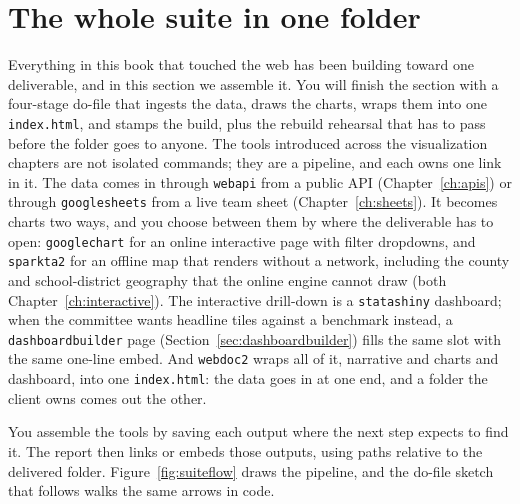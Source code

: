\documentclass[
    a4paper,
    fontsize=10pt,
    twoside=true,
    numbers=noenddot,
]{kaobook}
\begin{document}
\section{The whole suite in one folder}\label{sec:capstone}
Everything in this book that touched the web has been building toward one deliverable, and in this section we assemble it. You will finish the section with a four-stage do-file that ingests the data, draws the charts, wraps them into one \texttt{index.html}, and stamps the build, plus the rebuild rehearsal that has to pass before the folder goes to anyone. The tools introduced across the visualization chapters are not isolated commands; they are a pipeline, and each owns one link in it. The data comes in through \texttt{webapi} from a public API (Chapter~\ref{ch:apis}) or through \texttt{googlesheets} from a live team sheet (Chapter~\ref{ch:sheets}). It becomes charts two ways, and you choose between them by where the deliverable has to open: \texttt{googlechart} for an online interactive page with filter dropdowns, and \texttt{sparkta2} for an offline map that renders without a network, including the county and school-district geography that the online engine cannot draw (both Chapter~\ref{ch:interactive}). The interactive drill-down is a \texttt{statashiny} dashboard; when the committee wants headline tiles against a benchmark instead, a \texttt{dashboardbuilder} page (Section~\ref{sec:dashboardbuilder}) fills the same slot with the same one-line embed. And \texttt{webdoc2} wraps all of it, narrative and charts and dashboard, into one \texttt{index.html}: the data goes in at one end, and a folder the client owns comes out the other.

You assemble the tools by saving each output where the next step expects to find it. The report then links or embeds those outputs, using paths relative to the delivered folder. Figure~\ref{fig:suiteflow} draws the pipeline, and the do-file sketch that follows walks the same arrows in code.
\end{document}
